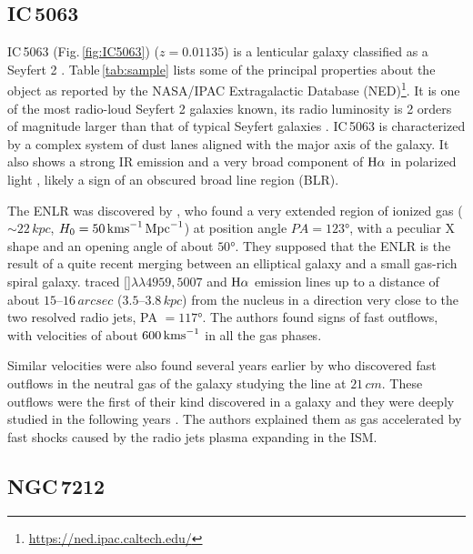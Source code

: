 \documentclass[../main.tex]{subfiles}
\begin{document}
\subsection{IC\,5063}
\label{sec:IC5063}




IC\,5063 (Fig.\,\ref{fig:IC5063}) ($z=0.01135$) is a lenticular galaxy classified as a Seyfert 2 \citep{Morganti07}.
Table\,\ref{tab:sample} lists some of the principal properties about the object as reported by the NASA/IPAC Extragalactic Database (NED)\footnote{\url{https://ned.ipac.caltech.edu/}}.
It is one of the most radio-loud Seyfert 2 galaxies known, its radio luminosity is 2 orders of magnitude larger than that of typical Seyfert galaxies \citep{Morganti98}.
IC\,5063 is characterized by a complex system of dust lanes aligned with the major axis of the galaxy.
It also shows a strong IR emission \citep{Hough87} and a very broad component of $\Ha$ in polarized light \citep{Inglis93}, likely a sign of an obscured broad line region (BLR).

The ENLR was discovered by \citet{Colina91}, who found a very extended region of ionized gas ($\sim 22\,\si{kpc}$, $H_0 =50\,\si{\kms.Mpc^{-1}}$) at position angle $PA = \ang{123}$, with a peculiar X shape and an opening angle of about $\ang{50}$. 
They supposed that the ENLR is the result of a quite recent merging between an elliptical galaxy and a small gas-rich spiral galaxy. 
\citet{Morganti07} traced []$\lambda\lambda4959, 5007$ and $\Ha$ emission lines up to a distance of about $15$--$16\,\si{arcsec}$ ($3.5$--$3.8\,\si{kpc}$) from the nucleus in a direction very close to the two resolved radio jets, PA $= \ang{117}$. 
The authors found signs of fast outflows, with velocities of about $600\,\si{\kms}$ in all the gas phases.

Similar velocities were also found several years earlier by \citet{Morganti98} who discovered fast outflows in the neutral gas of the galaxy studying the  line at $21\,\si{cm}$.
These outflows were the first of their kind discovered in a galaxy and they were deeply studied in the following years \citep{Morganti07,Tadhunter14,Morganti15}.
The authors explained them as gas accelerated by fast shocks caused by the radio jets plasma expanding in the ISM.


\subsection{NGC\,7212}
\label{sec:NGC7212}
\end{document}
